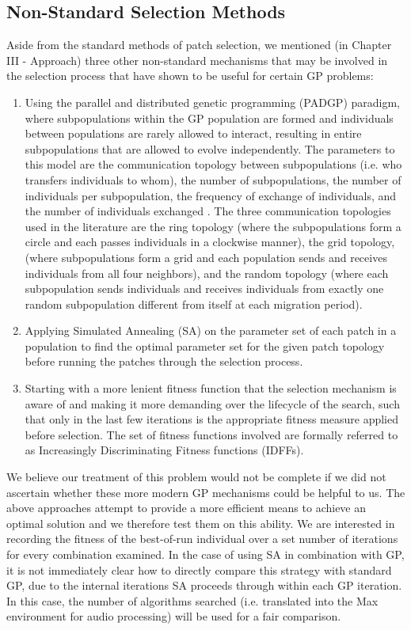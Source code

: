 \documentclass[12pt]{report} 	%
\numberwithin{figure}{chapter}
\numberwithin{table}{chapter}
\numberwithin{equation}{chapter}
\begin{document}
\begin{flushleft}
\subsection{Non-Standard Selection Methods}

Aside from the standard methods of patch selection, we mentioned (in Chapter III - Approach)  three other non-standard mechanisms that may be involved in the selection process that have shown to be useful for certain GP problems:

\begin{enumerate}
\item Using the parallel and distributed genetic programming (PADGP) paradigm, where subpopulations within the GP population are formed and individuals between populations are rarely allowed to interact, resulting in entire subpopulations that are allowed to evolve independently. The parameters to this model are the communication topology between subpopulations (i.e. who transfers individuals to whom), the number of subpopulations, the number of individuals per subpopulation, the frequency of exchange of individuals, and the number of individuals exchanged \cite[p. 178]{Vanneschi:2004le}. The three communication topologies used in the literature are the ring topology (where the subpopulations form a circle and each passes individuals in a clockwise manner), the grid topology, (where subpopulations form a grid and each population sends and receives individuals from all four neighbors), and the random topology (where each subpopulation sends individuals and receives individuals from exactly one random subpopulation different from itself at each migration period).
\item Applying Simulated Annealing (SA) on the parameter set of each patch in a population to find the optimal parameter set for the given patch topology before running the patches through the selection process.
\item Starting with a more lenient fitness function that the selection mechanism is aware of and making it more demanding over the lifecycle of the search, such that only in the last few iterations is the appropriate fitness measure applied before selection. The set of fitness functions involved are formally referred to as Increasingly Discriminating Fitness functions (IDFFs). 
\end{enumerate}

We believe our treatment of this problem would not be complete if we did not ascertain whether these more modern GP mechanisms could be helpful to us. The above approaches attempt to provide a more efficient means to achieve an optimal solution and we therefore test them on this ability. We are interested in recording the fitness of the best-of-run individual over a set number of iterations for every combination examined. In the case of using SA in combination with GP, it is not immediately clear how to directly compare this strategy with standard GP, due to the internal iterations SA proceeds through within each GP iteration. In this case, the number of algorithms searched (i.e. translated into the Max environment for audio processing) will be used for a fair comparison.


\end{flushleft}
\end{document}
